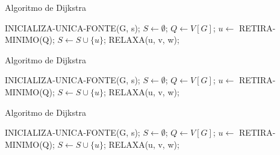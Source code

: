 \documentclass{beamer}
\begin{document}
	\begin{frame}{Algoritmo de Dijkstra}
		\begin{algorithm}[H]
			\caption{Dijkstra}\label{alg:d}
			\begin{algorithmic}[1]
				\State INICIALIZA-UNICA-FONTE(G, s);               
				\State $S\gets \emptyset$;
				\State $Q\gets V[G]$;
				\State $u\gets$ RETIRA-MINIMO(Q);              
				\State $S\gets S \cup \{u\}$;
				\State RELAXA(u, v, w);
				\EndFor
				\EndWhile\label{euclidendwhile}
				\EndProcedure
			\end{algorithmic}
		\end{algorithm}
	\end{frame}
	
	\begin{frame}{Algoritmo de Dijkstra}
		\begin{algorithm}[H]
			\caption{Dijkstra}\label{alg:d}
			\begin{algorithmic}[1]
				\State INICIALIZA-UNICA-FONTE(G, s);               
				\State $S\gets \emptyset$;
				\State $Q\gets V[G]$;
				                       
				\State $u\gets$ RETIRA-MINIMO(Q);               
				\State $S\gets S \cup \{u\}$;
				\State RELAXA(u, v, w);
				\EndFor
				\EndWhile\label{euclidendwhile}
				\EndProcedure
			\end{algorithmic}
		\end{algorithm}
	\end{frame}
	
	\begin{frame}{Algoritmo de Dijkstra}
		\begin{algorithm}[H]
			\caption{Dijkstra}\label{alg:d}
			\begin{algorithmic}[1]
				\State INICIALIZA-UNICA-FONTE(G, s);               
				\State $S\gets \emptyset$;
				\State $Q\gets V[G]$;
				                       
				\State $u\gets$ RETIRA-MINIMO(Q);               
				\State $S\gets S \cup \{u\}$;
				\State RELAXA(u, v, w);
				\EndFor
				\EndWhile\label{euclidendwhile}
				\EndProcedure
			\end{algorithmic}
		\end{algorithm}
	\end{frame}
	
\end{document}

